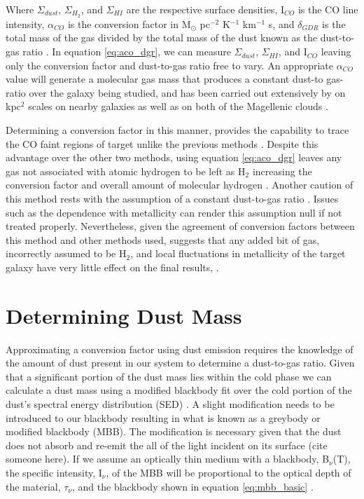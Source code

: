 Where $\Sigma_{dust}$, $\Sigma_{H_2}$, and $\Sigma_{HI}$ are the respective surface densities, I$_{CO}$ is the CO line intensity, $\alpha_{CO}$ is the conversion factor in M$_\odot$ pc$^{-2}$ K$^{-1}$ km$^{-1}$ s, and $\delta_{GDR}$ is the total mass of the gas divided by the total mass of the dust known as the dust-to-gas ratio \citep{leroy2011,sandstrom2013}.  In equation \ref{eq:aco_dgr}, we can measure $\Sigma_{dust}$, $\Sigma_{HI}$, and I$_{CO}$ leaving only the conversion factor and dust-to-gas ratio free to vary.  An appropriate $\alpha_{CO}$ value will generate a molecular gas mass that produces a constant dust-to gas-ratio over the galaxy being studied, and has been carried out extensively by \cite{sandstrom2013} on kpc$^2$ scales on nearby galaxies as well as on both of the Magellenic clouds \citep{leroy2011}.

Determining a conversion factor in this manner, provides the capability to trace the CO faint regions of target unlike the previous methods \citep{israel1997}.  Despite this advantage over the other two methods, using equation \ref{eq:aco_dgr} leaves any gas not associated with atomic hydrogen to be left as H$_2$ increasing the conversion factor and overall amount of molecular hydrogen \citep{bolatto2013}.  Another caution of this method rests with the assumption of a constant dust-to-gas ratio \citep{bolatto2013}.  Issues such as the dependence with metallicity  \citep{draine2007} can render this assumption null if not treated properly.  Nevertheless, given the agreement of conversion factors between this method and other methods used, suggests that any added bit of gas, incorrectly assumed to be H$_2$, and local fluctuations in metallicity of the target galaxy have very little effect on the final results, \citep{bolatto2013}.

\section{Determining Dust Mass}

Approximating a conversion factor using dust emission requires the knowledge of the amount of dust present in our system to determine a dust-to-gas ratio.  Given that a significant portion of the dust mass lies within the cold phase we can calculate a dust mass using a modified blackbody fit over the cold portion of the dust's spectral energy distribution (SED) \citep{galametz2012}.  A slight modification needs to be introduced to our blackbody resulting in what is known as a greybody or modified blackbody (MBB).  The modification is necessary given that the dust does not absorb and re-emit the all of the light incident on its surface (cite someone here).  If we assume an optically thin medium with a blackbody, B$_\nu$(T), the specific intensity, I$_\nu$, of the MBB will be proportional to the optical depth of the material, $\tau_\nu$, and the blackbody shown in equation \ref{eq:mbb_basic} \citep{planckXI2013}.


